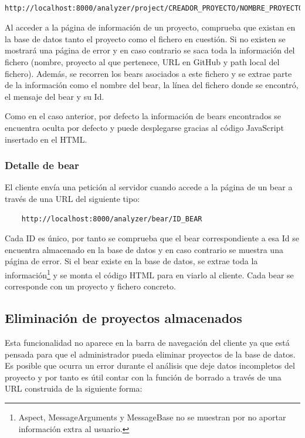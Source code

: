 \documentclass[a4paper, 12pt]{book}
\begin{document}
{\footnotesize
\begin{verbatim}
    http://localhost:8000/analyzer/project/CREADOR_PROYECTO/NOMBRE_PROYECTO/NOMBRE_FICHERO
\end{verbatim}
}

Al acceder a la página de información de un proyecto, comprueba que existan en la base de datos tanto el proyecto como el fichero en cuestión. Si no existen se mostrará una página de error y en caso contrario se saca toda la información del fichero (nombre, proyecto al que pertenece, URL en GitHub y path local del fichero). Además, se recorren los bears asociados a este fichero y se extrae parte de la información como el nombre del bear, la línea del fichero donde se encontró, el mensaje del bear y su Id.

Como en el caso anterior, por defecto la información de bears encontrados se encuentra oculta por defecto y puede desplegarse gracias al código JavaScript insertado en el HTML.

\subsubsection{Detalle de bear}
\label{sec:section12.4.3}
El cliente envía una petición al servidor cuando accede a la página de un bear a través de una URL del siguiente tipo:

{\footnotesize
\begin{verbatim}
    http://localhost:8000/analyzer/bear/ID_BEAR
\end{verbatim}
}

Cada ID es único, por tanto se comprueba que el bear correspondiente a esa Id se encuentra almacenado en la base de datos y en caso contrario se muestra una página de error. Si el bear existe en la base de datos, se extrae toda la información\footnote{Aspect, MessageArguments y MessageBase no se muestran por no aportar información extra al usuario.} y se monta el código HTML para en viarlo al cliente. Cada bear se corresponde con un proyecto y fichero concreto.

\subsection{Eliminación de proyectos almacenados}
\label{sec:seccion12.5}
Esta funcionalidad no aparece en la barra de navegación del cliente ya que está pensada para que el administrador pueda eliminar proyectos de la base de datos. Es posible que ocurra un error durante el análisis que deje datos incompletos del proyecto y por tanto es útil contar con la función de borrado a través de una URL construida de la siguiente forma:
\end{document}

